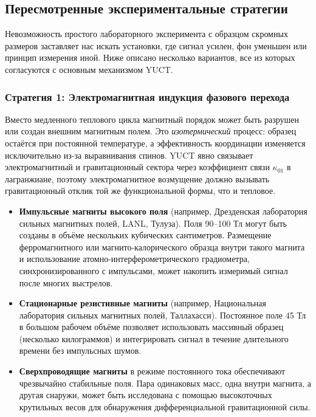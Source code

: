 \documentclass[12pt]{article}
\theoremstyle{remark}
\begin{document}
	\subsection{Пересмотренные экспериментальные стратегии}
	\label{subsec:lab-revised}
	
	Невозможность простого лабораторного эксперимента с образцом скромных размеров заставляет нас искать установки, где сигнал усилен, фон уменьшен или принцип измерения иной. Ниже описано несколько вариантов, все из которых согласуются с основным механизмом YUCT.
	
	\subsubsection*{Стратегия 1: Электромагнитная индукция фазового перехода}
	Вместо медленного теплового цикла магнитный порядок может быть разрушен или создан внешним магнитным полем. Это \emph{изотермический} процесс: образец остаётся при постоянной температуре, а эффективность координации изменяется исключительно из-за выравнивания спинов. YUCT явно связывает электромагнитный и гравитационный сектора через коэффициент связи $\kappa_{01}$ в лагранжиане, поэтому электромагнитное возмущение должно вызывать гравитационный отклик той же функциональной формы, что и тепловое.
	
	\begin{itemize}
		\item \textbf{Импульсные магниты высокого поля} (например, Дрезденская лаборатория сильных магнитных полей, LANL, Тулуза). Поля 90–100 Тл могут быть созданы в объёме нескольких кубических сантиметров. Размещение ферромагнитного или магнито-калорического образца внутри такого магнита и использование атомно-интерферометрического градиометра, синхронизированного с импульсами, может накопить измеримый сигнал после многих выстрелов.
		\item \textbf{Стационарные резистивные магниты} (например, Национальная лаборатория сильных магнитных полей, Таллахасси). Постоянное поле 45 Тл в большом рабочем объёме позволяет использовать массивный образец (несколько килограммов) и интегрировать сигнал в течение длительного времени без импульсных шумов.
		\item \textbf{Сверхпроводящие магниты} в режиме постоянного тока обеспечивают чрезвычайно стабильные поля. Пара одинаковых масс, одна внутри магнита, а другая снаружи, может быть исследована с помощью высокоточных крутильных весов для обнаружения дифференциальной гравитационной силы.
	\end{itemize}
	
\end{document}
